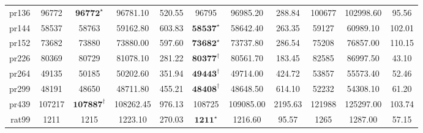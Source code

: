 \documentclass[12pt]{ctexart}
\begin{document}
\begin{table}[htbp]
\begin{tabular}{rcccccccccc}
        pr136                         & 96772                             & $\textbf{96772}^\star$      & 96781.10                               & 520.55           & 96795                   & 96985.20         & 288.84           & 100677                & 102998.60        & 95.56            \\
        pr144                         & 58537                             & 58763                       & 59162.80                               & 603.83           & $\textbf{58537}^\star$  & 58642.40         & 263.35           & 59127                 & 60989.10         & 102.01           \\
        pr152                         & 73682                             & 73880                       & 73880.00                               & 597.60           & $\textbf{73682}^\star$  & 73737.80         & 286.54           & 75208                 & 76857.00         & 110.15           \\
        pr226                         & 80369                             & 80729                       & 81078.10                               & 281.22           & $\textbf{80377}^\dag$   & 80561.70         & 183.45           & 82585                 & 86997.50         & 43.10            \\
        pr264                         & 49135                             & 50185                       & 50202.60                               & 351.94           & $\textbf{49443}^\dag$   & 49714.00         & 424.72           & 53857                 & 55573.40         & 52.46            \\
        pr299                         & 48191                             & 48650                       & 48711.80                               & 455.21           & $\textbf{48408}^\dag$   & 48648.50         & 614.10           & 52232                 & 54308.10         & 61.20            \\
        pr439                         & 107217                            & $\textbf{107887}^\dag$      & 108262.45                              & 976.13           & 108725                  & 109085.00        & 2195.63          & 121988                & 125297.00        & 103.74           \\
        rat99                         & 1211                              & 1215                        & 1223.10                                & 270.03           & $\textbf{1211}^\star$   & 1216.60          & 95.57            & 1265                  & 1287.00          & 57.15            \\

\end{tabular}
\end{table}
\end{document}
